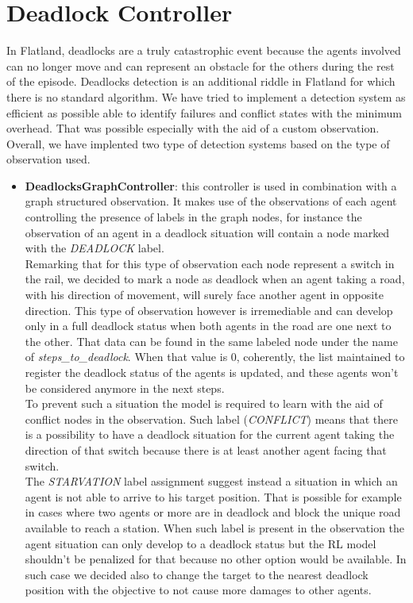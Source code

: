 \section{Deadlock Controller}
\label{sec:deadlockController}
In Flatland, deadlocks are a truly catastrophic event because the agents involved can no longer move and can represent an obstacle for the others during the rest of the episode. Deadlocks detection is an additional riddle in Flatland for which there is no standard algorithm. We have tried to implement a detection system as efficient as possible able to identify failures and conflict states with the minimum overhead. That was possible especially with the aid of a custom observation. Overall, we have implented two type of detection systems based on the type of observation used.
\begin{itemize}
	\item \textbf{DeadlocksGraphController}: this controller is used in combination with a graph structured observation. It makes use of the observations of each agent controlling the presence of labels in the graph nodes, for instance the observation of an agent in a deadlock situation will contain a node marked with the \textit{DEADLOCK} label.\\ Remarking that for this type of observation each node represent a switch in the rail, we decided to mark a node as deadlock when an agent taking a road, with his direction of movement, will surely face another agent in opposite direction. This type of observation however is irremediable and can develop only in a full deadlock status when both agents in the road are one next to the other. That data can be found in the same labeled node under the name of \textit{steps\_to\_deadlock}. When that value is 0, coherently, the list maintained to register the deadlock status of the agents is updated, and these agents won't be considered anymore in the next steps.\\
	To prevent such a situation the model is required to learn with the aid of conflict nodes in the observation. Such label (\textit{CONFLICT}) means that there is a possibility to have a deadlock situation for the current agent taking the direction of that switch because there is at least another agent facing that switch.\\
	The \textit{STARVATION} label assignment suggest instead a situation in which an agent is not able to arrive to his target position. That is possible for example in cases where two agents or more are in deadlock and block the unique road available to reach a station. When such label is present in the observation the agent situation can only develop to a deadlock status but the RL model shouldn't be penalized for that because no other option would be available. In such case we decided also to change the target to the nearest deadlock position with the objective to not cause more damages to other agents.

\end{itemize}
